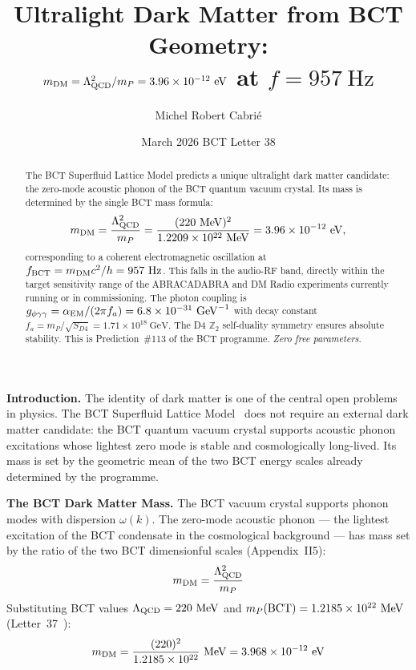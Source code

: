 \documentclass[aps,prl,twocolumn,superscriptaddress,floatfix]{revtex4-2}
\begin{document}
\title{Ultralight Dark Matter from BCT Geometry:\\
$m_{\rm DM} = \Lambda_{\rm QCD}^2/m_P = 3.96\times10^{-12}\ \mathrm{eV}$
at $f = 957\ \mathrm{Hz}$}

\author{Michel Robert Cabri\'e}

\date{March 2026 \quad BCT Letter 38}

\begin{abstract}
The BCT Superfluid Lattice Model predicts a unique ultralight dark matter candidate:
the zero-mode acoustic phonon of the BCT quantum vacuum crystal.
Its mass is determined by the single BCT mass formula:
\[
  m_{\rm DM} = \frac{\Lambda_{\rm QCD}^2}{m_P}
  = \frac{(220\ \mathrm{MeV})^2}{1.2209\times10^{22}\ \mathrm{MeV}}
  = 3.96\times10^{-12}\ \mathrm{eV},
\]
corresponding to a coherent electromagnetic oscillation at $f_{\rm BCT} = m_{\rm DM}c^2/h = 957\ \mathrm{Hz}$.
This falls in the audio-RF band, directly within the target sensitivity range of the
ABRACADABRA and DM Radio experiments currently running or in commissioning.
The photon coupling is $g_{\phi\gamma\gamma} = \alpha_{\rm EM}/(2\pi f_a) = 6.8\times10^{-31}\ \mathrm{GeV}^{-1}$
with decay constant $f_a = m_P/\sqrt{S_{D4}} = 1.71\times10^{18}\ \mathrm{GeV}$.
The D4 $\mathbb{Z}_2$ self-duality symmetry ensures absolute stability.
This is Prediction~\#113 of the BCT programme. \textit{Zero free parameters.}
\end{abstract}

\maketitle

\noindent\textbf{Introduction.}
The identity of dark matter is one of the central open problems in physics.
The BCT Superfluid Lattice Model~\cite{Monograph,PRL} does not require
an external dark matter candidate: the BCT quantum vacuum crystal supports
acoustic phonon excitations whose lightest zero mode is stable and cosmologically
long-lived. Its mass is set by the geometric mean of the two BCT energy scales
already determined by the programme.

\medskip
\noindent\textbf{The BCT Dark Matter Mass.}
The BCT vacuum crystal supports phonon modes with dispersion $\omega(k)$.
The zero-mode acoustic phonon — the lightest excitation of the BCT condensate
in the cosmological background — has mass set by the ratio of the two
BCT dimensionful scales (Appendix~II5):
\begin{equation}
  m_{\rm DM} = \frac{\Lambda_{\rm QCD}^2}{m_P}
  \label{eq:mDM}
\end{equation}
Substituting BCT values $\Lambda_{\rm QCD} = 220\ \mathrm{MeV}$ and
$m_P({\rm BCT}) = 1.2185\times10^{22}\ \mathrm{MeV}$ (Letter~37~\cite{L37}):
\begin{equation}
  m_{\rm DM} = \frac{(220)^2}{1.2185\times10^{22}}\ \mathrm{MeV}
  = 3.968\times10^{-12}\ \mathrm{eV}
  \label{eq:mDMnum}
\end{equation}
\end{document}
